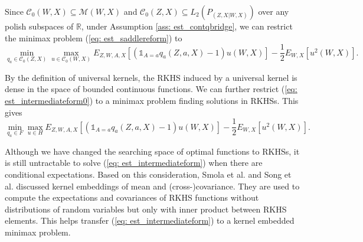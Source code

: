 Since $\mathcal{C}_0(W,X)\subseteq\mathcal{M}(W,X)$ and $\mathcal{C}_0(Z,X)\subseteq L_2(P_{(Z,X|W,X)})$ over any polish subspaces of $\mathbb{R}$, 
under Assumption \ref{ass: est_contqbridge}, we can restrict the minimax problem (\ref{eq: est_saddlereform}) to 
\begin{equation}
    \label{eq: est_intermediateform0}
    \min_{q_a\in \mathcal{C}_0(Z,X)} \max_{u\in\mathcal{C}_0(W,X)} E_{Z,W,A,X}[(\mathds{1}_{A=a}q_a(Z,a,X)-1)u(W,X)]-\frac{1}{2}E_{W,X}[u^2(W,X)]. 
\end{equation}

By the definition of universal kernels, the RKHS induced by a universal kernel is dense in the space of bounded continuous functions. 
We can further restrict (\ref{eq: est_intermediateform0}) to a minimax problem finding solutions in RKHSs. 
This gives 
\begin{equation}
    \label{eq: est_intermediateform}
    \min_{q_a\in F} \max_{u\in H} E_{Z,W,A,X}[(\mathds{1}_{A=a}q_a(Z,a,X)-1)u(W,X)]-\frac{1}{2}E_{W,X}[u^2(W,X)]. 
\end{equation}

Although we have changed the searching space of optimal functions to RKHSs, 
it is still untractable to solve (\ref{eq: est_intermediateform}) when there are conditional expectations. 
Based on this consideration, 
Smola et al.\cite{smola2007hilbert} and Song et al.\cite{song2013kernel} discussed kernel embeddings of mean and (cross-)covariance. 
They are used to compute the expectations and covariances of RKHS functions without distributions of random variables 
but only with inner product between RKHS elements. 
This helps transfer (\ref{eq: est_intermediateform}) to a kernel embedded minimax problem. 

